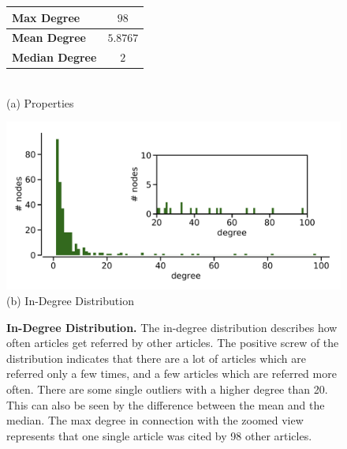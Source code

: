 \begin{figure}[!t]
  \begin{minipage}{\textwidth}
    \begin{minipage}[b]{0.39\textwidth}
      \centering
      \begin{tabular}{ l c }
        \toprule
        \textbf{Max Degree}    & $98$     \\ \midrule
        \textbf{Mean Degree}   & $5.8767$ \\ \midrule
        \textbf{Median Degree} & $2$      \\
        \bottomrule
    \end{tabular} \\
    \vspace*{1cm}
    (a) Properties
  \end{minipage}
  \begin{minipage}[b]{0.59\textwidth}
    \centering
    \includegraphics[width=1.0\textwidth]{figures/in-degree_distribution} \\
    (b) In-Degree Distribution
    \end{minipage}
  \end{minipage}
  \caption[In-Degree Distribution of the Citation Network]{\textbf{In-Degree Distribution.} The in-degree distribution describes how often articles get referred by other articles. The positive screw of the distribution indicates that there are a lot of articles which are referred only a few times, and a few articles which are referred more often. There are some single outliers with a higher degree than 20. This can also be seen by the difference between the mean and the median. The max degree in connection with the zoomed view represents that one single article was cited by 98 other articles.}
  \label{fig:indegree_distribution}
\end{figure}

